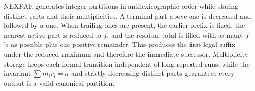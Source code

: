 \documentclass[10pt,letterpaper]{article}
\begin{document}
\begin{tcolorbox}[colback=Ink!4,colframe=Ink,title=Cornell summary]
NEXPAR generates integer partitions in antilexicographic order while storing distinct parts and their multiplicities. A terminal part above one is decreased and followed by a one. When trailing ones are present, the earlier prefix is fixed, the nearest active part is reduced to $f$, and the residual total is filled with as many $f$'s as possible plus one positive remainder. This produces the first legal suffix under the reduced maximum and therefore the immediate successor. Multiplicity storage keeps each formal transition independent of long repeated runs, while the invariant $\sum m_ir_i=n$ and strictly decreasing distinct parts guarantees every output is a valid canonical partition.
\end{tcolorbox}
\end{document}
